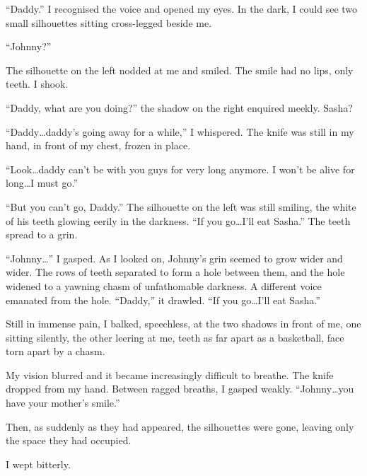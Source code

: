 ``Daddy.'' I recognised the voice and opened my eyes. In the dark, I
could see two small silhouettes sitting cross-legged beside
me.

``Johnny?''

The silhouette on the left nodded at me and smiled. The smile had
no lips, only teeth. I shook.

``Daddy, what are you doing?'' the shadow on the right enquired
meekly. Sasha?

``Daddy{\ldots}daddy's going away for a while,'' I whispered. The knife
was still in my hand, in front of my chest, frozen in place.

``Look{\ldots}daddy can't be with you guys for very long anymore. I won't
be alive for long{\ldots}I must go.''

``But you can't go, Daddy.'' The silhouette on the left was still
smiling, the white of his teeth glowing eerily in the darkness. ``If
you go{\ldots}I'll eat Sasha.'' The teeth spread to a grin.



``Johnny{\ldots}'' I gasped. As I looked on, Johnny's grin seemed to grow
wider and wider. The rows of teeth separated to form a hole between
them, and the hole widened to a yawning chasm of unfathomable
darkness. A different voice emanated from the hole. ``Daddy,'' it
drawled. ``If you go{\ldots}I'll eat Sasha.''



Still in immense pain, I balked, speechless, at the two shadows in
front of me, one sitting silently, the other leering at me, teeth
as far apart as a basketball, face torn apart by a chasm.

My vision blurred and it became increasingly difficult to breathe.
The knife dropped from my hand. Between ragged breaths, I gasped
weakly. ``Johnny{\ldots}you have your mother's smile.''



Then, as suddenly as they had appeared, the silhouettes were gone,
leaving only the space they had occupied.



I wept bitterly. 
 



